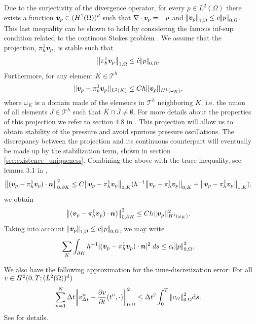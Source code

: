 Due to the surjectivity of the divergence operator, for every $p \in  L^2(\Omega)$  there exists a function ${\boldsymbol{v}_{p}} \in (H^1(\Omega))^d$ such that  $\nabla \cdot {\boldsymbol{v}_{p}} = -p$ and ${\left\vert\kern-0.25ex\left\vert {\boldsymbol{v}_{p}} \right\vert\kern-0.25ex\right\vert}_{1,\Omega} \leq c{\left\vert\kern-0.25ex\left\vert p \right\vert\kern-0.25ex\right\vert}_{0,\Omega} $. This last inequality can be shown to hold by considering the famous inf-sup condition related to the continous Stokes problem \citep{brezzi1991mixed,brenner2008mathematical}. We assume that the projection, $\pi_{h}^{1}{\boldsymbol{v}_{p}}$, is stable such that
\begin{equation}
 {\left\vert\kern-0.25ex\left\vert \pi_{h}^{1}{\boldsymbol{v}_{p}} \right\vert\kern-0.25ex\right\vert}_{1,\Omega} \leq  \hat{c}{\left\vert\kern-0.25ex\left\vert p \right\vert\kern-0.25ex\right\vert}_{0,\Omega}.
\label{clem_bound}
\end{equation}
Furthermore, for any element $ K \in \mathcal{T}^{h}$
\begin{equation}
\label{Clem_error}
||{{\boldsymbol{v}_{p}} - \pi_{h}^{1} {\boldsymbol{v}_{p}}}||_{L^2(K)} \leq C h ||{{\boldsymbol{v}_{p}}}||_{H^1( \omega_K)} ,
\end{equation}
where $\omega_K$ is a domain made of the elements in $\mathcal{T}^{h}$ neighboring $K$, i.e. the union of all elements $J\in \mathcal{T}^{h}$ such that $\overline{K} \cap \overline{J} \neq \emptyset$. For more details about the properties of this projection we refer to section 4.8 in \citet{brenner2008mathematical}. This projection will allow us to obtain stability of the pressure and avoid spurious pressure oscillations. The discrepancy between the projection and its continuous counterpart will eventually be made up by the stabilization term, shown in section \ref{sec:existence_uniqueness}.
%
Combining the above with the trace inequality, see lemma 3.1 in \cite{verfurth1998posteriori},
\begin{equation}
\label{traceineq}
{\left\vert\kern-0.25ex\left\vert   ({\boldsymbol{v}_{p}} - \pi_{h}^{1}{\boldsymbol{v}_{p}})  \cdot \boldsymbol{n}\right\vert\kern-0.25ex\right\vert}_{0,\partial K}^{2} \leq C {\left\vert\kern-0.25ex\left\vert {\boldsymbol{v}_{p}} - \pi_{h}^{1} {\boldsymbol{v}_{p}}  \right\vert\kern-0.25ex\right\vert}_{0,K} (h^{-1}{\left\vert\kern-0.25ex\left\vert  {\boldsymbol{v}_{p}} - \pi_{h}^{1} {\boldsymbol{v}_{p}}  \right\vert\kern-0.25ex\right\vert}_{0,K}  + {\left\vert\kern-0.25ex\left\vert {\boldsymbol{v}_{p}} - \pi_{h}^{1} {\boldsymbol{v}_{p}}  \right\vert\kern-0.25ex\right\vert}_{1,K}  ),
\end{equation}
we obtain
\begin{equation}
\label{Clem_error_Kbdy}
{\left\vert\kern-0.25ex\left\vert ({\boldsymbol{v}_{p}} - \pi_{h}^{1}{\boldsymbol{v}_{p}}) \cdot \boldsymbol{n}) \right\vert\kern-0.25ex\right\vert}_{0,\partial K}^{2} \leq C h ||{{\boldsymbol{v}_{p}}}||_{H^1( \omega_K)} ^{2}.
\end{equation}
Taking into account ${\left\vert\kern-0.25ex\left\vert {\boldsymbol{v}_{p}} \right\vert\kern-0.25ex\right\vert}_{1,\Omega} \leq c{\left\vert\kern-0.25ex\left\vert p \right\vert\kern-0.25ex\right\vert}_{0,\Omega} $, we may write
\begin{equation}
\label{clem_jump_error}
\sum_{K} \int_{\partial K } h^{-1} |({\boldsymbol{v}_{p}} - \pi_{h}^{1} {\boldsymbol{v}_{p}}) \cdot \boldsymbol{n}|^{2} \;ds \leq c_{t} {\left\vert\kern-0.25ex\left\vert p \right\vert\kern-0.25ex\right\vert}_{0,\Omega}^{2}.
\end{equation}


We also have the following approximation for the time-discretization error:
For all ${\bf v} \in H^2(0,T; (L^2(\Omega))^d)$
\begin{equation}
\label{eq: time deriv error}
\sum_{n=1}^{N} \Delta t \ltwonorm{{\bf v}_{\Delta t}^{n} - \frac{\partial {\bf v}}{\partial t} (t^n,\cdot) }^{2}
\leq \Delta t^{2}  \int_{0}^{T} \ltwonorm{{\bf v}_{tt} }^{2} \mbox{d}s.
\end{equation}
See \citep{brenner2008mathematical,thomee2006galerkin} for details.

